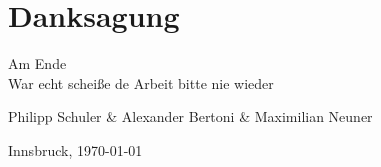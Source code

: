 \section*{Danksagung}

Am Ende \\
War echt scheiße de Arbeit bitte nie wieder
\vspace{1cm}

Philipp Schuler \& Alexander Bertoni \& Maximilian Neuner

Innsbruck, \today

\newpage